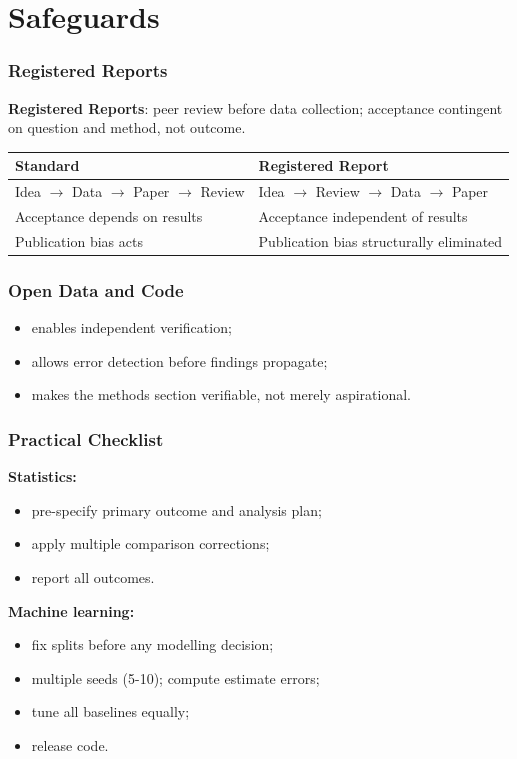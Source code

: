\documentclass[]{beamer}
\begin{document}
\section{Safeguards}

\begin{frame}[fragile]
\frametitle{Registered Reports}
\textbf{Registered Reports}: peer review before data collection; acceptance contingent on question and method, not outcome.

{\footnotesize
\begin{tabular}{p{4.5cm} p{4.5cm}}
\toprule
\textbf{Standard} & \textbf{Registered Report} \\
\midrule
Idea $\to$ Data $\to$ Paper $\to$ Review & Idea $\to$ Review $\to$ Data $\to$ Paper \\
\addlinespace
Acceptance depends on results & Acceptance independent of results \\
\addlinespace
Publication bias acts & Publication bias structurally eliminated \\
\bottomrule
\end{tabular}
}

\end{frame}

\begin{frame}[fragile]
\frametitle{Open Data and Code}
\begin{itemize}
  \item enables independent verification;
  \item allows error detection before findings propagate;
  \item makes the methods section verifiable, not merely aspirational.
\end{itemize}

\end{frame}

\begin{frame}[fragile]
\frametitle{Practical Checklist}
\textbf{Statistics:}
\begin{itemize}
  \item pre-specify primary outcome and analysis plan;
  \item apply multiple comparison corrections;
  \item report all outcomes.
\end{itemize}

\textbf{Machine learning:}
\begin{itemize}
  \item fix splits before any modelling decision;
  \item multiple seeds (5-10); compute estimate errors;
  \item tune all baselines equally;
  \item release code.
\end{itemize}

\end{frame}
\end{document}
